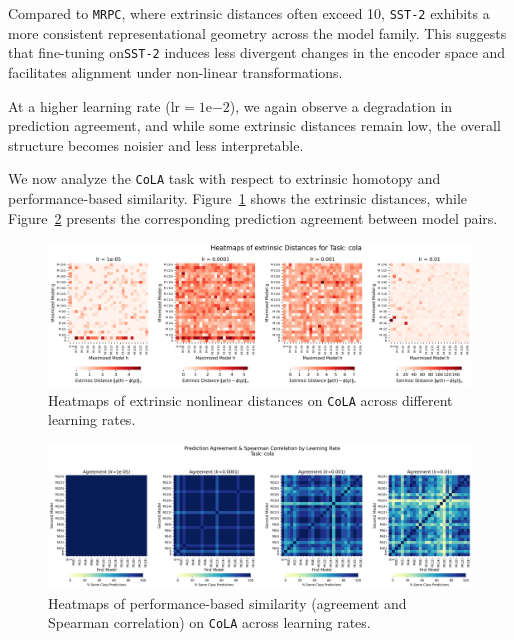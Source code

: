 Compared to \texttt{MRPC}, where extrinsic distances often exceed 10, \texttt{SST-2} exhibits a more consistent representational geometry across the model family.  
This suggests that fine-tuning on\texttt{SST-2} induces less divergent changes in the encoder space and facilitates alignment under non-linear transformations.

At a higher learning rate (\( \text{lr} = 1\mathrm{e}{-2} \)), we again observe a degradation in prediction agreement, and while some extrinsic distances remain low, the overall structure becomes noisier and less interpretable.

We now analyze the \texttt{CoLA} task with respect to extrinsic homotopy and performance-based similarity.  
Figure~\ref{fig:extr_cola} shows the extrinsic distances, while Figure~\ref{fig:perf_cola} presents the corresponding prediction agreement between model pairs.

\begin{figure}[h]
    \centering
    \includegraphics[width=\linewidth]{Abschlussarbeit/Pictures/heatmaps_smaller_circles/Heatmap_extrinsic_distance_all_lrs_cola_homotopy.png}
    \caption{Heatmaps of extrinsic nonlinear distances on \texttt{CoLA} across different learning rates.}
    \label{fig:extr_cola}
\end{figure}

\begin{figure}[h]
    \centering
    \includegraphics[width=\linewidth]{Abschlussarbeit/Pictures/PredictionAgreement_Spearman/_3Relu_final_training_HeatMap_cola_subplots_per_lr_4.png}
    \caption{Heatmaps of performance-based similarity (agreement and Spearman correlation) on \texttt{CoLA} across learning rates.}
    \label{fig:perf_cola}
\end{figure}

